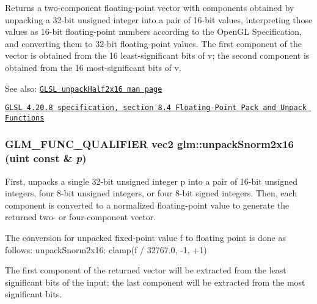 Returns a two-component floating-point vector with components obtained by unpacking a 32-bit unsigned integer into a pair of 16-bit values, interpreting those values as 16-bit floating-point numbers according to the OpenGL Specification, and converting them to 32-bit floating-point values. The first component of the vector is obtained from the 16 least-significant bits of v; the second component is obtained from the 16 most-significant bits of v.

\begin{Desc}
\item[See also:]\href{http://www.opengl.org/sdk/docs/manglsl/xhtml/unpackHalf2x16.xml}{\tt GLSL unpackHalf2x16 man page} 

\href{http://www.opengl.org/registry/doc/GLSLangSpec.4.20.8.pdf}{\tt GLSL 4.20.8 specification, section 8.4 Floating-Point Pack and Unpack Functions} \end{Desc}
\hypertarget{group__core__func__packing_ga3f9bd6a71d7bdfab090b9626f2466aa}{
\subsubsection[unpackSnorm2x16]{\setlength{\rightskip}{0pt plus 5cm}GLM\_\-FUNC\_\-QUALIFIER vec2 glm::unpackSnorm2x16 (uint const \& {\em p})}}
\label{group__core__func__packing_ga3f9bd6a71d7bdfab090b9626f2466aa}


First, unpacks a single 32-bit unsigned integer p into a pair of 16-bit unsigned integers, four 8-bit unsigned integers, or four 8-bit signed integers. Then, each component is converted to a normalized floating-point value to generate the returned two- or four-component vector.

The conversion for unpacked fixed-point value f to floating point is done as follows: unpackSnorm2x16: clamp(f / 32767.0, -1, +1)

The first component of the returned vector will be extracted from the least significant bits of the input; the last component will be extracted from the most significant bits.

